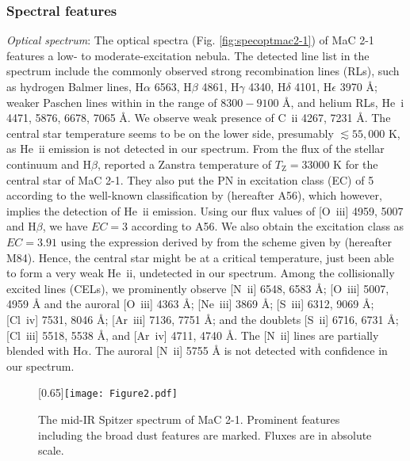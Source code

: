 \documentclass[a4paper,fleqn,usenatbib]{mnras}
\begin{document}
\subsubsection{Spectral features} \label{sec:specfeatures}
{\textit{Optical spectrum}:} The optical spectra (Fig. \ref{fig:specoptmac2-1}) of MaC 2-1 features a low- to moderate-excitation nebula. The detected line list in the spectrum include the commonly observed strong recombination lines (RLs), such as hydrogen Balmer lines, H$\alpha$ 6563, H$\beta$ 4861, H$\gamma$ 4340, H$\delta$ 4101, H$\epsilon$ 3970 {\AA}; weaker Paschen lines within in the range of $8300-9100$ {\AA}, and helium RLs, He~{\sc i} 4471, 5876, 6678, 7065 {\AA}. We observe weak presence of C~{\sc ii} 4267, 7231 {\AA}. The central star temperature seems to be on the lower side, presumably $\lesssim55,000$ K, as He~{\sc ii} emission is not detected in our spectrum. From the flux of the stellar continuum and $\mathrm{H}\beta$, \cite{1989A&A...222..237G} reported a Zanstra temperature of $T_\mathrm{Z}=33000$ K for the central star of MaC 2-1. They also put the PN in excitation class (EC) of 5 according to the well-known classification by \citet{1956gn.book.....A} (hereafter A56), which however, implies the detection of He~{\sc ii} emission. Using our flux values of [O~{\sc iii}] 4959, 5007 and $\mathrm{H}\beta$, we have $EC=3$ according to A56. We also obtain the excitation class as $EC=3.91$ using the expression derived by \citet{1990ApJ...357..140D} from the scheme given by \citet{1984MNRAS.208..633M} (hereafter M84). Hence, the central star might be at a critical temperature, just been able to form a very weak He~{\sc ii}, undetected in our spectrum. Among the collisionally excited lines (CELs), we prominently observe [N~{\sc ii}] 6548, 6583 {\AA}; [O~{\sc iii}] 5007, 4959 {\AA} and the auroral [O~{\sc iii}] 4363 {\AA}; [Ne~{\sc iii}] 3869 {\AA}; [S~{\sc iii}] 6312, 9069 {\AA}; [Cl~{\sc iv}] 7531, 8046 {\AA}; [Ar~{\sc iii}] 7136, 7751 {\AA}; and the doublets [S~{\sc ii}] 6716, 6731 {\AA}; [Cl~{\sc iii}] 5518, 5538 {\AA}, and [Ar~{\sc iv}] 4711, 4740 {\AA}. The [N~{\sc ii}] lines are partially blended with H$\alpha$. The auroral [N~{\sc ii}] 5755 {\AA} is not detected with confidence in our spectrum. 

\begin{figure}
\centering
\scalebox{0.65}[0.65]{\texttt{[image: Figure2.pdf]}}
 \caption{The mid-IR Spitzer spectrum of MaC 2-1. Prominent features including the broad dust features are marked. Fluxes are in absolute scale. \label{fig:specmirmac2-1}}
\end{figure} 
\end{document}
